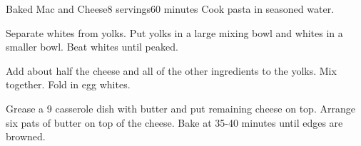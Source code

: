 \documentclass[../Cookbook.tex]{subfiles}
\begin{document}
\begin{recipe}[BakedMacAndCheese]{Baked Mac and Cheese}{8 servings}{60 minutes}
	Cook pasta in seasoned water.

	Separate whites from yolks. Put yolks in a large mixing bowl and whites in a smaller bowl.
	Beat whites until peaked.

	Add about half the cheese and all of the other ingredients to the yolks. Mix together.
	Fold in egg whites.

	Grease a 9 casserole dish with butter and put remaining cheese on top. Arrange six pats of butter on top of the cheese.
	Bake at  35-40 minutes until edges are browned.
\end{recipe}
\end{document}
